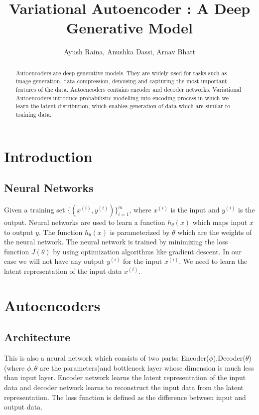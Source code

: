 \documentclass[10pt,a4paper,twoside]{tau-book}
\title{Variational Autoencoder : A Deep Generative Model}
\author{Ayush Raina, Anushka Dassi, Arnav Bhatt}
\begin{document}
\maketitle
\thispagestyle{firststyle}

\begin{abstract}
    Autoencoders are deep generative models. They are widely used for tasks such as image generation, data compression, denoising and capturing the most important features of the data. Autoencoders contains encoder and decoder networks. Variational Autoencoders introduce probabilistic modelling into encoding process in which we learn the latent distribution, which enables generation of data which are similar to training data.
\end{abstract}

\section{Introduction} 
\subsection{Neural Networks}
Given a training set $\{(x^{(i)}, y^{(i)})\}_{i=1}^{m}$, where $x^{(i)}$ is the input and $y^{(i)}$ is the output. Neural networks are used to learn a function $h_{\theta}(x)$ which maps input $x$ to output $y$. The function $h_{\theta}(x)$ is parameterized by $\theta$ which are the weights of the neural network. The neural network is trained by minimizing the loss function $J(\theta)$ by using optimization algorithms like gradient descent. In our case we will not have any output $y^{(i)}$ for the input $x^{(i)}$. We need to learn the latent representation of the input data $x^{(i)}$.

\section{Autoencoders}
\subsection{Architecture}
This is also a neural network which consists of two parts: Encoder($\phi$),Decoder($\theta$) (where $\phi, \theta$ are the parameters)and bottleneck layer whose dimension is much less than input layer. Encoder network learns the latent representation of the input data and decoder network learns to reconstruct the input data from the latent representation. The loss function is defined as the difference between input and output data.
\end{document}

